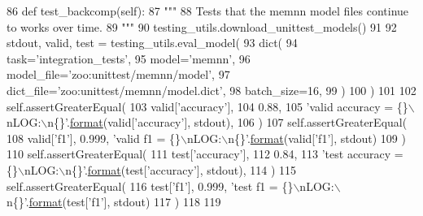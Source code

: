 \begin{DoxyCode}
86     \textcolor{keyword}{def }test\_backcomp(self):
87         \textcolor{stringliteral}{"""}
88 \textcolor{stringliteral}{        Tests that the memnn model files continue to works over time.}
89 \textcolor{stringliteral}{        """}
90         testing\_utils.download\_unittest\_models()
91 
92         stdout, valid, test = testing\_utils.eval\_model(
93             dict(
94                 task=\textcolor{stringliteral}{'integration\_tests'},
95                 model=\textcolor{stringliteral}{'memnn'},
96                 model\_file=\textcolor{stringliteral}{'zoo:unittest/memnn/model'},
97                 dict\_file=\textcolor{stringliteral}{'zoo:unittest/memnn/model.dict'},
98                 batch\_size=16,
99             )
100         )
101 
102         self.assertGreaterEqual(
103             valid[\textcolor{stringliteral}{'accuracy'}],
104             0.88,
105             \textcolor{stringliteral}{'valid accuracy = \{\}\(\backslash\)nLOG:\(\backslash\)n\{\}'}.\hyperlink{namespaceparlai_1_1chat__service_1_1services_1_1messenger_1_1shared__utils_a32e2e2022b824fbaf80c747160b52a76}{format}(valid[\textcolor{stringliteral}{'accuracy'}], stdout),
106         )
107         self.assertGreaterEqual(
108             valid[\textcolor{stringliteral}{'f1'}], 0.999, \textcolor{stringliteral}{'valid f1 = \{\}\(\backslash\)nLOG:\(\backslash\)n\{\}'}.\hyperlink{namespaceparlai_1_1chat__service_1_1services_1_1messenger_1_1shared__utils_a32e2e2022b824fbaf80c747160b52a76}{format}(valid[\textcolor{stringliteral}{'f1'}], stdout)
109         )
110         self.assertGreaterEqual(
111             test[\textcolor{stringliteral}{'accuracy'}],
112             0.84,
113             \textcolor{stringliteral}{'test accuracy = \{\}\(\backslash\)nLOG:\(\backslash\)n\{\}'}.\hyperlink{namespaceparlai_1_1chat__service_1_1services_1_1messenger_1_1shared__utils_a32e2e2022b824fbaf80c747160b52a76}{format}(test[\textcolor{stringliteral}{'accuracy'}], stdout),
114         )
115         self.assertGreaterEqual(
116             test[\textcolor{stringliteral}{'f1'}], 0.999, \textcolor{stringliteral}{'test f1 = \{\}\(\backslash\)nLOG:\(\backslash\)n\{\}'}.\hyperlink{namespaceparlai_1_1chat__service_1_1services_1_1messenger_1_1shared__utils_a32e2e2022b824fbaf80c747160b52a76}{format}(test[\textcolor{stringliteral}{'f1'}], stdout)
117         )
118 
119 
\end{DoxyCode}
\mbox{\label{classtests_1_1test__memnn_1_1TestMemnn_a2e52386c91c00701e4e58c72e100074d}} 
